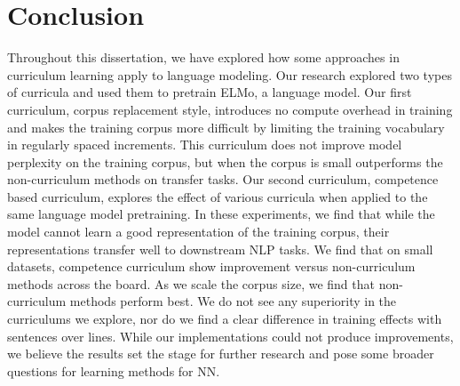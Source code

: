 \chapter{Conclusion}
\label{chap:conclusion}
Throughout this dissertation, we have explored how some approaches in curriculum learning apply to language modeling. Our research explored two types of curricula and used them to pretrain ELMo, a language model. Our first curriculum, corpus replacement style, introduces no compute overhead in training and makes the training corpus more difficult by limiting the training vocabulary in regularly spaced increments. This curriculum does not improve model perplexity on the training corpus, but when the corpus is small outperforms the non-curriculum methods on transfer tasks. Our second curriculum, competence based curriculum, explores the effect of various curricula when applied to the same language model pretraining. In these experiments, we find that while the model cannot learn a good representation of the training corpus, their representations transfer well to downstream NLP tasks. We find that on small datasets, competence curriculum show improvement versus non-curriculum methods across the board. As we scale the corpus size, we find that non-curriculum methods perform best. We do not see any superiority in the curriculums we explore, nor do we find a clear difference in training effects with sentences over lines. While our implementations could not produce improvements, we believe the results set the stage for further research and pose some broader questions for learning methods for NN. 